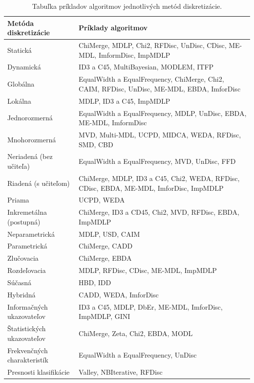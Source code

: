 \begin{table}[h!]
	\centering
	\begin{tabular} { |p{5cm}|p{10cm}| }
		\hline 
		\textbf{Metóda diskretizácie} & \textbf{Príklady algoritmov} \\ 
		\hline 
		Statická & ChiMerge, MDLP, Chi2, RFDisc, UnDisc, CDisc, ME-MDL, ImformDisc, ImpMDLP \\ 
		\hline 
		Dynamická & ID3 a C45, MultiBayesian, MODLEM, ITFP \\ 
		\hline 
		Globálna  & EqualWidth a EqualFrequency, ChiMerge, Chi2, CAIM, RFDisc, UnDisc, ME-MDL, EBDA, ImforDisc \\ 
		\hline 
		Lokálna & MDLP, ID3 a C45, ImpMDLP \\ 
		\hline 
		Jednorozmerná & EqualWidth a EqualFrequency, MDLP, UnDisc, EBDA, ME-MDL, ImformDisc \\ 
		\hline 
		Mnohorozmerná & MVD, Multi-MDL, UCPD, MIDCA, WEDA, RFDisc, SMD, CBD \\ 
		\hline 
		Neriadená (bez učiteľa)  & EqualWidth a EqualFrequency, MVD, UnDisc, FFD \\ 
		\hline 
		Riadená (s učiteľom) & ChiMerge, MDLP, ID3 a C45, Chi2, WEDA, RFDisc, CDisc, EBDA, ME-MDL, ImforDisc, ImpMDLP \\ 
		\hline 
		Priama & UCPD, WEDA \\ 
		\hline 
		Inkremetálna (postupná) & ChiMerge, ID3 a CD45, Chi2, MVD, RFDisc, EBDA, ImpMDLP \\ 
		\hline 
		Neparametrická & MDLP, USD, CAIM \\ 
		\hline 
		Parametrická & ChiMerge, CADD \\ 
		\hline 
		Zlučovacia & ChiMerge, EBDA \\ 
		\hline 
		Rozdeľovacia & MDLP, RFDisc, CDisc, ME-MDL, ImpMDLP \\ 
		\hline 	Súčasná & HBD, IDD \\ 
		\hline 
		Hybridná  & CADD, WEDA, ImforDisc \\ 
		\hline 
		Informačných ukazovateľov & ID3 a C45, MDLP, DbEr, ME-MDL, ImforDisc, ImpMDLP, GINI \\ 
		\hline 
		Štatistických ukazovateľov & ChiMerge, Zeta, Chi2, EBDA, MODL \\ 
		\hline 
		Frekvenčných charakteristík & EqualWidth a EqualFrequency, UnDisc \\ 
		\hline 
		Presnosti klasifikácie & Valley, NBIterative, RFDisc \\ 
		\hline 
	\end{tabular} 
	\caption{Tabuľka príkladov algoritmov jednotlivých metód diskretizácie.}
	\label{table:1}
\end{table}
 
